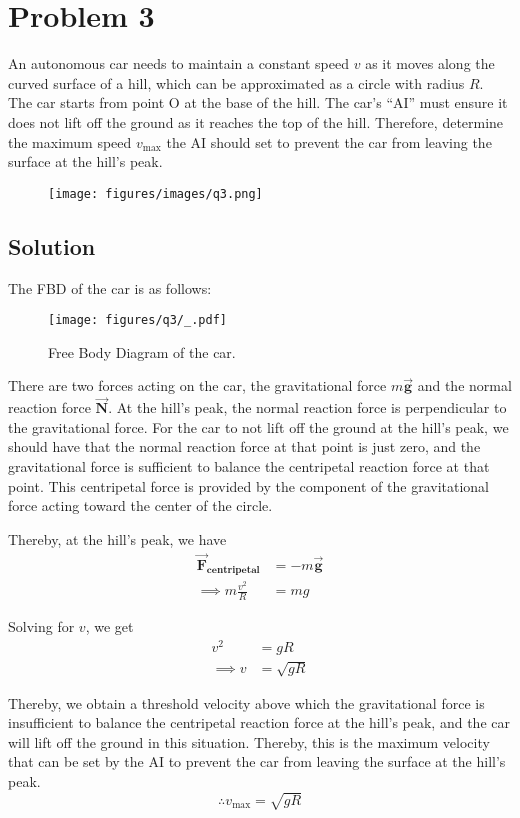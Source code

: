\section*{Problem 3}

An autonomous car needs to maintain a constant speed \( v \) as it moves along the curved surface of a hill, which can be approximated as a circle with radius \( R \).
The car starts from point O at the base of the hill.
The car's ``AI'' must ensure it does not lift off the ground as it reaches the top of the hill.
Therefore, determine the maximum speed \( v_{\max} \) the AI should set to prevent the car from leaving the surface at the hill's peak.

\begin{figure*}[h]
    \centering
    \texttt{[image: figures/images/q3.png]}
\end{figure*}

\subsection*{Solution}

The FBD of the car is as follows:
\begin{figure*}[h]
    \centering
    \texttt{[image: figures/q3/\_.pdf]}
    \caption{
        Free Body Diagram of the car.
    }
\end{figure*}

There are two forces acting on the car, the gravitational force \( m\vec{\mathbf{g}} \) and the normal reaction force \( \vec{\mathbf{N}} \).
At the hill's peak, the normal reaction force is perpendicular to the gravitational force.
For the car to not lift off the ground at the hill's peak, we should have that the normal reaction force at that point is just zero, and the gravitational force is sufficient to balance the centripetal reaction force at that point.
This centripetal force is provided by the component of the gravitational force acting toward the center of the circle.

Thereby, at the hill's peak, we have
\begin{align*}
    \vec{\mathbf{F}}_{\textbf{centripetal}}
     & =
    - m\vec{\mathbf{g}}
    \\ \implies
    m\frac{v^2}{R}
     & =
    mg
\end{align*}

Solving for \( v \), we get
\begin{align*}
    v^2 & = gR        \\
    \implies
    v   & = \sqrt{gR}
\end{align*}

Thereby, we obtain a threshold velocity above which the gravitational force is insufficient to balance the centripetal reaction force at the hill's peak, and the car will lift off the ground in this situation.
Thereby, this is the maximum velocity that can be set by the AI to prevent the car from leaving the surface at the hill's peak.
\[
    \therefore \boxed{v_{\max} = \sqrt{gR}}
\]
